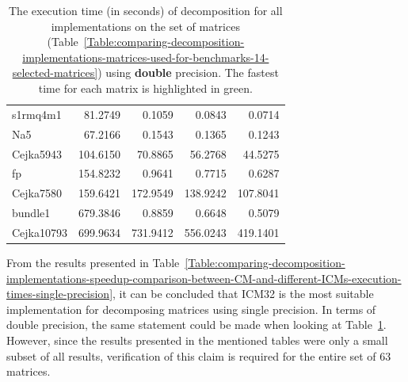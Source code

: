 \begin{table}[ht!]
\begin{tabular}{|>{\footnotesize}l|>{\raggedleft\arraybackslash\footnotesize}r|>{\raggedleft\arraybackslash\footnotesize}r|>{\raggedleft\arraybackslash\footnotesize}r|>{\raggedleft\arraybackslash\footnotesize}r|}
		s1rmq4m1        &                    81.2749 &                     0.1059 &                     0.0843 & \cellcolor{green!25}  0.0714 \\
		Na5             &                    67.2166 &                     0.1543 &                     0.1365 & \cellcolor{green!25}  0.1243 \\
		Cejka5943		&                   104.6150 &                    70.8865 &                    56.2768 & \cellcolor{green!25} 44.5275 \\
		fp              &                   154.8232 &                     0.9641 &                     0.7715 & \cellcolor{green!25}  0.6287 \\
		Cejka7580		&                   159.6421 &                   172.9549 &                   138.9242 & \cellcolor{green!25}107.8041 \\
		bundle1         &                   679.3846 &                     0.8859 &                     0.6648 & \cellcolor{green!25}  0.5079 \\
		Cejka10793      &                   699.9634 &                   731.9412 &                   556.0243 & \cellcolor{green!25}419.1401 \\ \hline
	\end{tabular}
	\caption{The execution time (in seconds) of decomposition for all implementations on the set of matrices (Table~\ref{Table:comparing-decomposition-implementations-matrices-used-for-benchmarks-14-selected-matrices}) using \textbf{double} precision. The fastest time for each matrix is highlighted in green.}
	\label{Table:comparing-decomposition-implementations-speedup-comparison-between-CM-and-different-ICMs-execution-times-double-precision}
\end{table}

From the results presented in Table~\ref{Table:comparing-decomposition-implementations-speedup-comparison-between-CM-and-different-ICMs-execution-times-single-precision}, it can be concluded that ICM32 is the most suitable implementation for decomposing matrices using single precision. In terms of double precision, the same statement could be made when looking at Table~\ref{Table:comparing-decomposition-implementations-speedup-comparison-between-CM-and-different-ICMs-execution-times-double-precision}. However, since the results presented in the mentioned tables were only a small subset of all results, verification of this claim is required for the entire set of 63 matrices.

